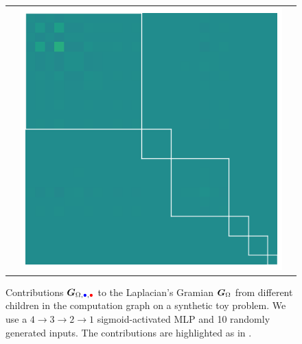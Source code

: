 \begin{figure}[t]
\begin{tabular}{ccc}
    &
      \includegraphics[width=0.22\linewidth]{kfac_pinns_exp/exp04_gramian_contributions/fig/gram_hess_input_hess_input.png}
  \end{tabular}
  \caption{Contributions ${\bm{G}}_{\Omega,\textcolor{blue}{\bullet}, \textcolor{red}{\bullet}}$ to the Laplacian's Gramian ${\bm{G}}_{\Omega}$ from different children in the computation graph on a synthetic toy problem.
    We use a $4 \to 3 \to 2 \to 1$ sigmoid-activated MLP and 10 randomly generated inputs. The contributions are highlighted as in .}\label{fig:gramian-contribution-children}
\end{figure}
